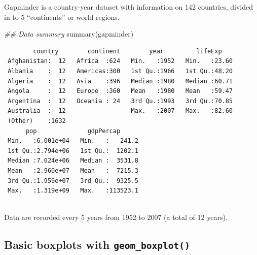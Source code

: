 \documentclass[
  letterpaper,
  DIV=11,
  numbers=noendperiod]{scrreprt}
\newenvironment{Shaded}{\begin{snugshade}}{\end{snugshade}}
\newcommand{\DocumentationTok}[1]{\textcolor[rgb]{0.37,0.37,0.37}{\textit{#1}}}
\newcommand{\FunctionTok}[1]{\textcolor[rgb]{0.28,0.35,0.67}{#1}}
\newcommand{\NormalTok}[1]{\textcolor[rgb]{0.00,0.23,0.31}{#1}}
\begin{document}
\begin{tcolorbox}[enhanced jigsaw, colframe=quarto-callout-note-color-frame, rightrule=.15mm, opacityback=0, breakable, coltitle=black, colbacktitle=quarto-callout-note-color!10!white, bottomrule=.15mm, leftrule=.75mm, toprule=.15mm, arc=.35mm, bottomtitle=1mm, colback=white, left=2mm, opacitybacktitle=0.6, titlerule=0mm, title=\textcolor{quarto-callout-note-color}{\faInfo}\hspace{0.5em}{Recap}, toptitle=1mm]

Gapminder is a country-year dataset with information on 142 countries,
divided in to 5 ``continents'' or world regions.

\begin{Shaded}
\begin{Highlighting}[]
\DocumentationTok{\#\# Data summary}
\FunctionTok{summary}\NormalTok{(gapminder)}
\end{Highlighting}
\end{Shaded}

\begin{verbatim}
        country        continent        year         lifeExp     
 Afghanistan:  12   Africa  :624   Min.   :1952   Min.   :23.60  
 Albania    :  12   Americas:300   1st Qu.:1966   1st Qu.:48.20  
 Algeria    :  12   Asia    :396   Median :1980   Median :60.71  
 Angola     :  12   Europe  :360   Mean   :1980   Mean   :59.47  
 Argentina  :  12   Oceania : 24   3rd Qu.:1993   3rd Qu.:70.85  
 Australia  :  12                  Max.   :2007   Max.   :82.60  
 (Other)    :1632                                                
      pop              gdpPercap       
 Min.   :6.001e+04   Min.   :   241.2  
 1st Qu.:2.794e+06   1st Qu.:  1202.1  
 Median :7.024e+06   Median :  3531.8  
 Mean   :2.960e+07   Mean   :  7215.3  
 3rd Qu.:1.959e+07   3rd Qu.:  9325.5  
 Max.   :1.319e+09   Max.   :113523.1  
                                       
\end{verbatim}

Data are recorded every 5 years from 1952 to 2007 (a total of 12 years).

\end{tcolorbox}

\hypertarget{basic-boxplots-with-geom_boxplot}{%
\subsection{\texorpdfstring{Basic boxplots with
\texttt{geom\_boxplot()}}{Basic boxplots with geom\_boxplot()}}\label{basic-boxplots-with-geom_boxplot}}
\end{document}
